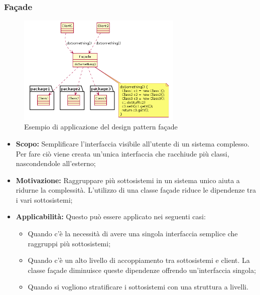 \documentclass{scalatekids-article}
\begin{document}
\subsubsection{Façade}

\begin{figure}[H]
  \begin{center}
    \includegraphics[width=0.7\textwidth, keepaspectratio]{img/designPattern/Facade.png}
    \caption{Esempio di applicazione del design pattern façade}
  \end{center}
\end{figure}

\begin{itemize}

\item \textbf{Scopo:} Semplificare l'interfaccia visibile all'utente di un sistema complesso.
Per fare ciò viene creata un'unica interfaccia che racchiude più classi, nascondendole all'esterno;

\item \textbf{Motivazione:} Raggruppare più sottosistemi in un sistema unico aiuta a ridurne la complessità.
L'utilizzo di una classe façade riduce le dipendenze tra i vari sottosistemi;

\item \textbf{Applicabilità:} Questo  può essere
applicato nei seguenti casi:
  \begin{itemize}
  \item Quando c'è la necessità di avere una singola interfaccia semplice che raggruppi più sottosistemi;
  \item Quando c'è un alto livello di accoppiamento tra sottosistemi e client. La
  classe façade diminuisce queste dipendenze offrendo un'interfaccia singola;
  \item Quando si vogliono stratificare i sottosistemi con una struttura a livelli.
  \end{itemize}

\end{itemize}
\end{document}
